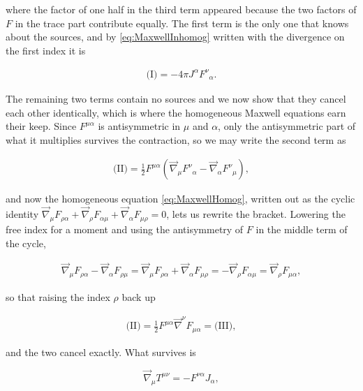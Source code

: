         where the factor of one half in the third term appeared because the two factors of $F$ in the trace part contribute equally. The first term is the only one that knows about the sources, and by \ref{eq:MaxwellInhomog} written with the divergence on the first index it is

        \begin{align*}
            \text{(I)} = -4\pi J^{\alpha}F^{\nu}_{\;\;\alpha}.
        \end{align*}

        The remaining two terms contain no sources and we now show that they cancel each other identically, which is where the homogeneous Maxwell equations earn their keep. Since $F^{\mu\alpha}$ is antisymmetric in $\mu$ and $\alpha$, only the antisymmetric part of what it multiplies survives the contraction, so we may write the second term as

        \begin{align*}
            \text{(II)} = \frac{1}{2}F^{\mu\alpha}\left(\Vec{\nabla}_{\mu}F^{\nu}_{\;\;\alpha} - \Vec{\nabla}_{\alpha}F^{\nu}_{\;\;\mu}\right),
        \end{align*}

        and now the homogeneous equation \ref{eq:MaxwellHomog}, written out as the cyclic identity $\Vec{\nabla}_{\mu}F_{\rho\alpha} + \Vec{\nabla}_{\rho}F_{\alpha\mu} + \Vec{\nabla}_{\alpha}F_{\mu\rho} = 0$, lets us rewrite the bracket. Lowering the free index for a moment and using the antisymmetry of $F$ in the middle term of the cycle,

        \begin{align*}
            \Vec{\nabla}_{\mu}F_{\rho\alpha} - \Vec{\nabla}_{\alpha}F_{\rho\mu} = \Vec{\nabla}_{\mu}F_{\rho\alpha} + \Vec{\nabla}_{\alpha}F_{\mu\rho} = -\Vec{\nabla}_{\rho}F_{\alpha\mu} = \Vec{\nabla}_{\rho}F_{\mu\alpha},
        \end{align*}

        so that raising the index $\rho$ back up

        \begin{align*}
            \text{(II)} = \frac{1}{2}F^{\mu\alpha}\Vec{\nabla}^{\nu}F_{\mu\alpha} = \text{(III)},
        \end{align*}

        and the two cancel exactly. What survives is

        \begin{equation}\label{eq:TemDivergence}
            \Vec{\nabla}_{\mu}T^{\mu\nu} = -F^{\nu\alpha}J_{\alpha},
        \end{equation}

